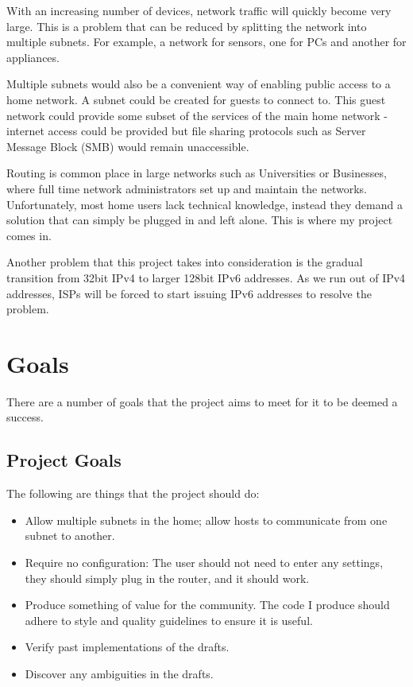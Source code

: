 \documentclass[12pt]{report}
\begin{document}
With an increasing number of devices, network traffic will quickly become very
large. This is a problem that can be reduced by splitting the network into
multiple subnets. For example, a network for sensors, one for PCs and another
for appliances. 

Multiple subnets would also be a convenient way of enabling public access to a
home network. A subnet could be created for guests to connect to. This guest
network could provide some subset of the services of the main home network -
internet access could be provided but file sharing protocols such as Server
Message Block (SMB) would remain unaccessible.

Routing is common place in large networks such as Universities or Businesses,
where full time network administrators set up and maintain the networks.
Unfortunately, most home users lack technical knowledge, instead they demand a
solution that can simply be plugged in and left alone. This is where my project
comes in. 

Another problem that this project takes into consideration is the gradual
transition from 32bit IPv4 to larger 128bit IPv6 addresses. As we run out of IPv4
addresses, ISPs will be forced to start issuing IPv6 addresses to resolve the
problem.

\section{Goals}
There are a number of goals that the project aims to meet for it to be deemed
a success.

\subsection{Project Goals}
The following are things that the project should do:

\begin{itemize}
	\item Allow multiple subnets in the home; allow hosts to communicate
	from one subnet to another.
	\item Require no configuration: The user should not need to enter any 
	settings, they should simply plug in the router, and it should work.
	\item Produce something of value for the community. The code I produce  
	should adhere to style and quality guidelines to ensure it is useful.
	\item Verify past implementations of the drafts.
	\item Discover any ambiguities in the drafts.
\end{itemize}
\end{document}
